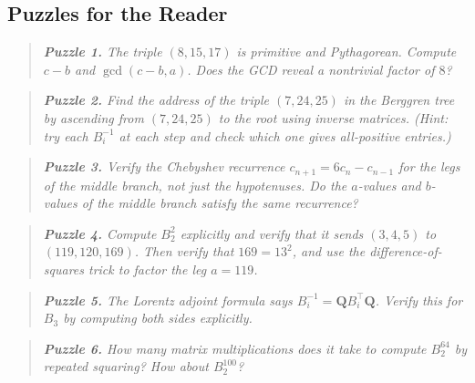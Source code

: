 \subsection*{Puzzles for the Reader}



\begin{quote}
\itshape
\textbf{Puzzle 1.} The triple $(8, 15, 17)$ is primitive and Pythagorean. Compute $c - b$ and $\gcd(c - b, a)$. Does the GCD reveal a nontrivial factor of $8$?
\end{quote}



\begin{quote}
\itshape
\textbf{Puzzle 2.} Find the address of the triple $(7, 24, 25)$ in the Berggren tree by ascending from $(7, 24, 25)$ to the root using inverse matrices. (Hint: try each $B_i^{-1}$ at each step and check which one gives all-positive entries.)
\end{quote}



\begin{quote}
\itshape
\textbf{Puzzle 3.} Verify the Chebyshev recurrence $c_{n+1} = 6c_n - c_{n-1}$ for the \textit{legs} of the middle branch, not just the hypotenuses. Do the $a$-values and $b$-values of the middle branch satisfy the same recurrence?
\end{quote}



\begin{quote}
\itshape
\textbf{Puzzle 4.} Compute $B_2^2$ explicitly and verify that it sends $(3, 4, 5)$ to $(119, 120, 169)$. Then verify that $169 = 13^2$, and use the difference-of-squares trick to factor the leg $a = 119$.
\end{quote}



\begin{quote}
\itshape
\textbf{Puzzle 5.} The Lorentz adjoint formula says $B_i^{-1} = \mathbf{Q} B_i^\top \mathbf{Q}$. Verify this for $B_3$ by computing both sides explicitly.
\end{quote}



\begin{quote}
\itshape
\textbf{Puzzle 6.} How many matrix multiplications does it take to compute $B_2^{64}$ by repeated squaring? How about $B_2^{100}$?
\end{quote}

